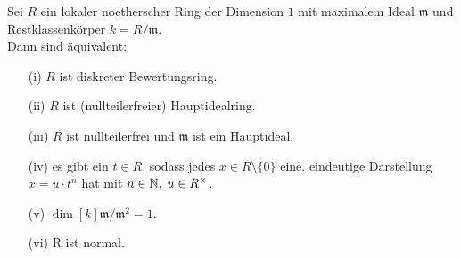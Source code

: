 \documentclass[a4paper, 10pt]{report}
\begin{document}
\begin{Satz} 
\label{Satz12}
Sei $R$ ein lokaler noetherscher Ring der Dimension $1$ mit maximalem Ideal
$\mathfrak{m}$ und Restklassenkörper $k = R/\mathfrak{m}$.\\
Dann sind äquivalent:
\begin{enumerate}
  \item[(i)] $R$ ist diskreter Bewertungsring.
  \item[(ii)] $R$ ist (nullteilerfreier) Hauptidealring.
  \item[(iii)] $R$ ist nullteilerfrei und $\mathfrak{m}$ ist ein Hauptideal.
  \item[(iv)] es gibt ein $t \in R$, sodass jedes $x \in R \setminus \{0\}$ eine.
  eindeutige Darstellung $x=u \cdot t^n$ hat mit $n \in \mathbb{N}, \; u \in
  R^{\times}$.
  \item[(v)] $\dim[k]{\mathfrak{m}/\mathfrak{m}^2} = 1$.
  \item[(vi)] R ist normal.
\end{enumerate}
\end{Satz}
\end{document}
